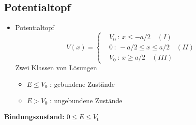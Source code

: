 \documentclass[10pt,article,colorback,accentcolor=tud9d]{scrartcl}
\begin{document}
\subsection{Potentialtopf}
\begin{itemize}
  \item Potentialtopf
    \begin{equation}
    V(x)=\left\{
    \begin{aligned}
    &V_0 \ : \ x\leq -a/2 \quad (I)\\
    &0 \ : \ -a/2\leq x\leq a/2 \quad (II) \\
    &V_0 \ : \ x\geq a/2 \quad (III)
    \end{aligned}
    \right.
    \end{equation}
    Zwei Klassen von Lösungen
    \begin{itemize}
      \item $E\leq V_0$ : gebundene Zustände
      \item $E>V_0$ : ungebundene Zustände
    \end{itemize}
    \end{itemize}
    \textbf{Bindungszustand:} $0\leq E \leq V_0$
\end{document}
